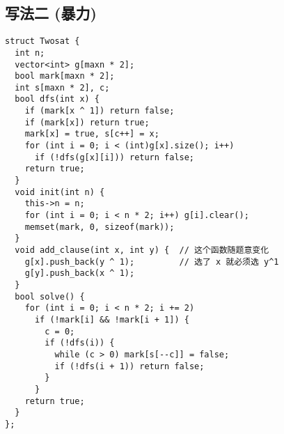 \subsection{写法二 (暴力)}
\begin{verbatim}
struct Twosat {
  int n;
  vector<int> g[maxn * 2];
  bool mark[maxn * 2];
  int s[maxn * 2], c;
  bool dfs(int x) {
    if (mark[x ^ 1]) return false;
    if (mark[x]) return true;
    mark[x] = true, s[c++] = x;
    for (int i = 0; i < (int)g[x].size(); i++)
      if (!dfs(g[x][i])) return false;
    return true;
  }
  void init(int n) {
    this->n = n;
    for (int i = 0; i < n * 2; i++) g[i].clear();
    memset(mark, 0, sizeof(mark));
  }
  void add_clause(int x, int y) {  // 这个函数随题意变化
    g[x].push_back(y ^ 1);         // 选了 x 就必须选 y^1
    g[y].push_back(x ^ 1);
  }
  bool solve() {
    for (int i = 0; i < n * 2; i += 2)
      if (!mark[i] && !mark[i + 1]) {
        c = 0;
        if (!dfs(i)) {
          while (c > 0) mark[s[--c]] = false;
          if (!dfs(i + 1)) return false;
        }
      }
    return true;
  }
};
\end{verbatim}
\clearpage